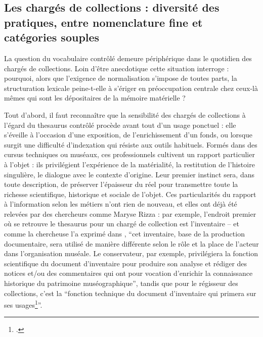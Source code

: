 \subsection{Les chargés de collections : diversité des pratiques, entre nomenclature fine et catégories souples}

La question du vocabulaire contrôlé demeure périphérique dans le quotidien des chargés de collections. Loin d’être anecdotique cette situation interroge : pourquoi, alors que l’exigence de normalisation s’impose de toutes parts, la structuration lexicale peine-t-elle à s’ériger en préoccupation centrale chez ceux-là mêmes qui sont les dépositaires de la mémoire matérielle ?

\medskip

Tout d'abord, il faut reconnaître que la sensibilité des chargés de collections à l’égard du \gls{thesaurus} contrôlé procède avant tout d'un usage ponctuel : elle s’éveille à l’occasion d’une exposition, de l'enrichissement d'un fonds, ou lorsque surgit une difficulté d’indexation qui résiste aux outils habituels. Formés dans des cursus techniques ou muséaux, ces professionnels cultivent un rapport particulier à l’objet : ils privilégient l’expérience de la matérialité, la restitution de l’histoire singulière, le dialogue avec le contexte d’origine. Leur premier instinct sera, dans toute description, de préserver l'épaisseur du réel pour transmettre toute la richesse scientifique, historique et sociale de l'objet. Ces particularités du rapport à l'information selon les métiers n'ont rien de nouveau, et elles ont déjà été relevées par des chercheurs comme Maryse Rizza : par exemple, l'endroit premier où se retrouve le \gls{thesaurus} pour un chargé de collection est l'inventaire -- et comme la chercheuse l'a exprimé dans , \enquote{cet inventaire, base de la production documentaire, sera utilisé de manière différente selon le rôle et la place de l’acteur dans l’organisation muséale. Le conservateur, par exemple, privilégiera la fonction scientifique du document d’inventaire pour produire son analyse et rédiger des notices et/ou des commentaires qui ont pour vocation d’enrichir la connaissance historique du patrimoine muséographique}, tandis que pour le régisseur des collections, c’est la \enquote{fonction technique du document d’inventaire qui primera sur ses usages\footcite{rizzaDocumentAuCoeur2014}}.

\medskip

